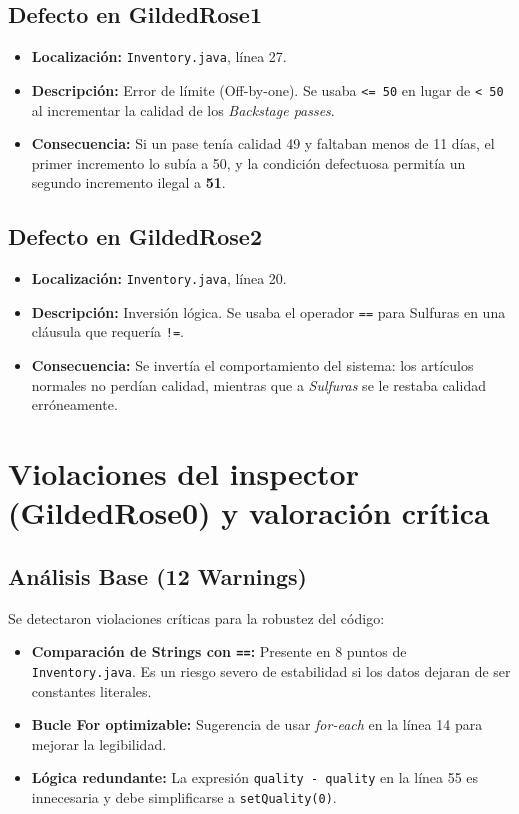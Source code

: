 \documentclass[12pt,a4paper]{article}
\begin{document}
\subsection*{Defecto en GildedRose1}
\begin{itemize}
    \item \textbf{Localización:} \texttt{Inventory.java}, línea 27.
    \item \textbf{Descripción:} Error de límite (Off-by-one). Se usaba \texttt{<= 50} en lugar de \texttt{< 50} al incrementar la calidad de los \textit{Backstage passes}.
    \item \textbf{Consecuencia:} Si un pase tenía calidad 49 y faltaban menos de 11 días, el primer incremento lo subía a 50, y la condición defectuosa permitía un segundo incremento ilegal a \textbf{51}.
\end{itemize}

\subsection*{Defecto en GildedRose2}
\begin{itemize}
    \item \textbf{Localización:} \texttt{Inventory.java}, línea 20.
    \item \textbf{Descripción:} Inversión lógica. Se usaba el operador \texttt{==} para Sulfuras en una cláusula que requería \texttt{!=}.
    \item \textbf{Consecuencia:} Se invertía el comportamiento del sistema: los artículos normales no perdían calidad, mientras que a \textit{Sulfuras} se le restaba calidad erróneamente.
\end{itemize}

\section{Violaciones del inspector (GildedRose0) y valoración crítica}

\subsection*{Análisis Base (12 Warnings)}
Se detectaron violaciones críticas para la robustez del código:
\begin{itemize}
    \item \textbf{Comparación de Strings con \texttt{==}:} Presente en 8 puntos de \texttt{Inventory.java}. Es un riesgo severo de estabilidad si los datos dejaran de ser constantes literales.
    \item \textbf{Bucle For optimizable:} Sugerencia de usar \textit{for-each} en la línea 14 para mejorar la legibilidad.
    \item \textbf{Lógica redundante:} La expresión \texttt{quality - quality} en la línea 55 es innecesaria y debe simplificarse a \texttt{setQuality(0)}.
\end{itemize}
\end{document}
